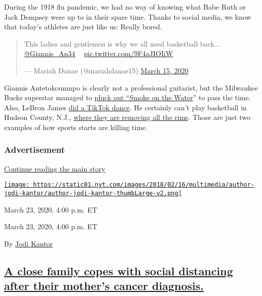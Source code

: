 During the 1918 flu pandemic, we had no way of knowing what Babe Ruth or
Jack Dempsey were up to in their spare time. Thanks to social media, we
know that today's athletes are just like us: Really bored.

\begin{quote}
This ladies and gentlemen is why we all need basketball back...
\href{https://twitter.com/Giannis_An34?ref_src=twsrc\%5Etfw}{@Giannis\_An34}
🎸😂 \href{https://t.co/9F4aJIOIiW}{pic.twitter.com/9F4aJIOIiW}

--- Mariah Danae (@mariahdanae15)
\href{https://twitter.com/mariahdanae15/status/1239003226139250693?ref_src=twsrc\%5Etfw}{March
15, 2020}
\end{quote}

Giannis Antetokounmpo is clearly not a professional guitarist, but the
Milwaukee Bucks superstar managed to
\href{https://twitter.com/mariahdanae15/status/1239003226139250693}{pluck
out ``Smoke on the Water}'' to pass the time. Also, LeBron James
\href{https://www.instagram.com/p/B-C6OQEg2j0/}{did a TikTok dance}. He
certainly can't play basketball in Hudson County, N.J.,
\href{https://www.nj.com/hudson/2020/03/hudson-county-to-remove-rims-on-basketball-hoops-to-slow-coronavirus-spread.html}{where
they are removing all the rims}. Those are just two examples of how
sports starts are killing time.

\hypertarget{advertisement-3}{%
\subsubsection{Advertisement}\label{advertisement-3}}

\protect\hyperlink{after-dfp-ad-mid4}{Continue reading the main story}

\href{https://www.nytimes.com/by/jodi-kantor}{\texttt{[image: https://static01.nyt.com/images/2018/02/16/multimedia/author-jodi-kantor/author-jodi-kantor-thumbLarge-v2.png]}}

March 23, 2020, 4:00 p.m. ET

March 23, 2020, 4:00 p.m. ET

By \href{https://www.nytimes.com/by/jodi-kantor}{Jodi Kantor}

\hypertarget{a-close-family-copes-with-social-distancing-after-their-mothers-cancer-diagnosis}{%
\subsection{\texorpdfstring{\protect\hyperlink{a-close-family-copes-with-social-distancing-after-their-mothers-cancer-diagnosis}{A
close family copes with social distancing after their mother's cancer
diagnosis.}}{A close family copes with social distancing after their mother's cancer diagnosis.}}\label{a-close-family-copes-with-social-distancing-after-their-mothers-cancer-diagnosis}}

